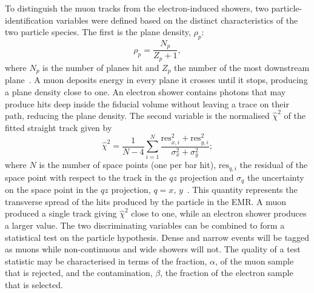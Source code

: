 To distinguish the muon tracks from the electron-induced showers,
two particle-identification variables were defined based on the
distinct characteristics of the two particle species.
The first is the plane density, $\rho_p$:
\begin{equation}
  \rho_p = \frac{N_p}{Z_p+1},
\end{equation}
where $N_p$ is the number of planes hit and $Z_p$ the number of the
most downstream plane~\cite{2015JInst..10P2012A}.
A muon deposits energy in every plane it crosses until it stops,
producing a plane density close to one.
An electron shower contains photons that may produce hits deep inside
the fiducial volume without leaving a trace on their path, reducing
the plane density.
The second variable is the normalised $\hat{\chi}^2$ of the fitted
straight track given by
\begin{equation}
  \hat{\chi}^2=\frac{1}{N-4}\sum_{i=1}^{N}\frac{\text{res}_{x,i}^2+\text{res}_{y,i}^2}{\sigma_x^2+\sigma_y^2};
\end{equation}
where $N$ is the number of space points (one per bar hit),
$\text{res}_{q,i}$ the residual of the space point with respect to the
track in the $qz$ projection and $\sigma_q$ the uncertainty on the
space point in the $qz$ projection, $q=x,\,y$~\cite{Drielsma:thesis}.
This quantity represents the transverse spread of the hits produced by
the particle in the EMR.
A muon produced a single track giving
$\hat{\chi}^2$ close to one, while an electron shower produces a larger value.
The two discriminating variables can be combined to form a statistical
test on the particle hypothesis. 
Dense and narrow events will be tagged as muons while non-continuous
and wide showers will not.  
The quality of a test statistic may be characterised in terms of the
fraction, $\alpha$, of the muon sample that is rejected, and the 
contamination, $\beta$, the fraction of the electron sample that is
selected. 


